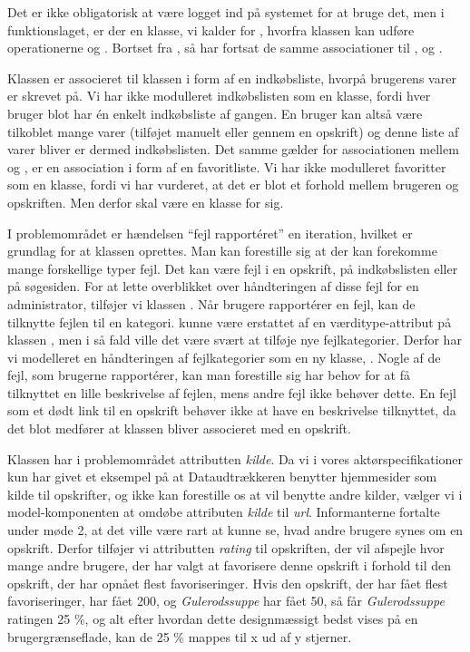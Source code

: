 Det er ikke obligatorisk at være logget ind på systemet for at bruge det, men i funktionslaget, er der en klasse, vi kalder for , hvorfra klassen  kan udføre operationerne  og . Bortset fra , så har  fortsat de samme associationer til ,  og . 

Klassen  er associeret til klassen  i form af en indkøbsliste, hvorpå brugerens varer er skrevet på. Vi har ikke modulleret indkøbslisten som en klasse, fordi hver bruger blot har én enkelt indkøbsliste af gangen. En bruger kan altså være tilkoblet mange varer (tilføjet manuelt eller gennem en opskrift) og denne liste af varer bliver er dermed indkøbslisten. Det samme gælder for associationen mellem  og , er en association i form af en favoritliste. Vi har ikke modulleret favoritter som en klasse, fordi vi har vurderet, at det er blot et forhold mellem brugeren og opskriften. Men derfor skal  være en klasse for sig.

I problemområdet er hændelsen ``fejl rapportéret'' en iteration, hvilket er grundlag for at klassen  oprettes. Man kan forestille sig at der kan forekomme mange forskellige typer fejl. Det kan være fejl i en opskrift, på indkøbslisten eller på søgesiden. For at lette overblikket over håndteringen af disse fejl for en administrator, tilføjer vi klassen . Når brugere rapportérer en fejl, kan de tilknytte fejlen til en kategori.  kunne være erstattet af en værditype-attribut på klassen , men i så fald ville det være svært at tilføje nye fejlkategorier. Derfor har vi modelleret en håndteringen af fejlkategorier som en ny klasse, . Nogle af de fejl, som brugerne rapportérer, kan man forestille sig har behov for at få tilknyttet en lille beskrivelse af fejlen, mens andre fejl ikke behøver dette. En fejl som \fx et dødt link til en opskrift behøver ikke at have en beskrivelse tilknyttet, da det blot medfører at klassen  bliver associeret med en opskrift.

Klassen  har i problemområdet attributten \textit{kilde}. Da vi i vores aktørspecifikationer kun har givet et eksempel på at Dataudtrækkeren benytter hjemmesider som kilde til opskrifter, og ikke kan forestille os at \Foodl{} vil benytte andre kilder, vælger vi i model-komponenten at omdøbe attributen \textit{kilde} til \textit{url}. Informanterne fortalte under møde 2, at det ville være rart at kunne se, hvad andre brugere synes om en opskrift. Derfor tilføjer vi attributten \textit{rating} til opskriften, der vil afspejle hvor mange andre brugere, der har valgt at favorisere denne opskrift i forhold til den opskrift, der har opnået flest favoriseringer. Hvis den opskrift, der har fået flest favoriseringer, har fået 200, og \textit{Gulerodssuppe} har fået 50, så får \textit{Gulerodssuppe} ratingen 25 \%, og alt efter hvordan dette designmæssigt bedst vises på en brugergrænseflade, kan de 25 \% mappes til \fx x ud af y stjerner.